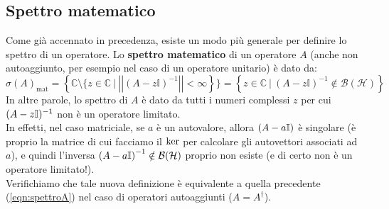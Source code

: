 \begin{comment}



\section{Lezione 3:\\ \large{Formulazione assiomatica Hilbertiana (o Standard)}}
\vspace{-1em}
\begin{center}
    \small{(17/10/2018)}
\end{center}
\end{comment}

\subsection{Spettro matematico}
\begin{comment}
Abbiamo definito lo spettro di un'osservabile $O$ descritta dall'operatore $A$ come:
\begin{equation}
\sigma \left(A\right)= \left\{a\in\mathbb{R}\ |\inf_{\psi\in D\left(A\right)}{\left(\Delta A\right)_{a,\psi}=0}\right\}
\label{eqn:spettroA}
\end{equation}
\end{comment}
Come già accennato in precedenza, esiste un modo più generale per definire lo spettro di un operatore. Lo \textbf{spettro matematico} di un operatore $A$ (anche non autoaggiunto, per esempio nel caso di un operatore unitario) è dato da:
\[
\sigma \left(A\right)_{\text{mat}}= \left\{\mathbb{C}\setminus \{ z\in\mathbb{C}\ |\ \left|\left|\left(A-z\mathbb{I}\right)^{-1}\right|\right|<\infty\right\}\}
=\left\{z\in\mathbb{C}\ |\
\left(A-z\mathbb{I}\right)^{-1}\notin\mathcal{B}(\mathcal{H})\right\}
\]
In altre parole, lo spettro di $A$ è dato da tutti i numeri complessi $z$ per cui $(A-z\mathbb{I})^{-1}$ non è un operatore limitato.\\
In effetti, nel caso matriciale, se $a$ è un autovalore, allora $(A-a\mathbb{I})$ è singolare (è proprio la matrice di cui facciamo il $\operatorname{ker}$ per calcolare gli autovettori associati ad $a$), e quindi l'inversa $\left(A-a\mathbb{I}\right)^{-1}\notin \mathcal{B}(\mathcal{H})$ proprio non esiste (e di certo non è un operatore limitato!).\\
Verifichiamo che tale nuova definizione è equivalente a quella precedente (\ref{eqn:spettroA}) nel caso di operatori autoaggiunti ($A=A^\dag$).\\
